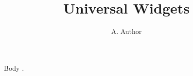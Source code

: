 \documentclass[sigconf]{acmart}
\title{Universal Widgets}
\author{A. Author}
\begin{document}
\maketitle
Body \thetitle.
\end{document}
